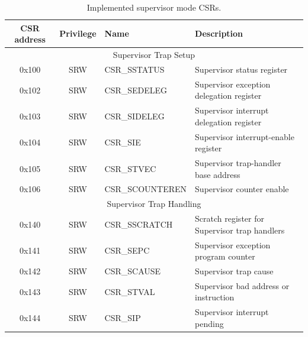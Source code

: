 \documentclass[../main.tex]{subfiles}
\begin{document}
\begin{table}[p]
\centering
\begin{tabular}{|c|c|p{3.5cm}| p{6.2cm}|} 
\hline
CSR address & Privilege & Name & Description \\
\hline
\multicolumn{4}{|c|}{Supervisor Trap Setup}\\
\hline
0x100 & SRW & CSR\_SSTATUS & Supervisor status register\\
0x102 & SRW & CSR\_SEDELEG & Supervisor exception delegation register\\
0x103 & SRW & CSR\_SIDELEG & Supervisor interrupt delegation register\\
0x104 & SRW & CSR\_SIE & Supervisor interrupt-enable register\\
0x105 & SRW & CSR\_STVEC & Supervisor trap-handler base address\\
0x106 & SRW & CSR\_SCOUNTEREN & Supervisor counter enable\\
\hline
\multicolumn{4}{|c|}{Supervisor Trap Handling}\\
\hline
0x140 & SRW & CSR\_SSCRATCH & Scratch register for Supervisor trap handlers\\
0x141 & SRW & CSR\_SEPC & Supervisor exception program counter\\
0x142 & SRW & CSR\_SCAUSE & Supervisor trap cause\\
0x143 & SRW & CSR\_STVAL & Supervisor bad address or instruction\\
0x144 & SRW & CSR\_SIP & Supervisor interrupt pending\\
\hline
\end{tabular}
\caption{Implemented supervisor mode CSRs.}
\label{tab:super_CSRs}
\end{table}
\end{document}
